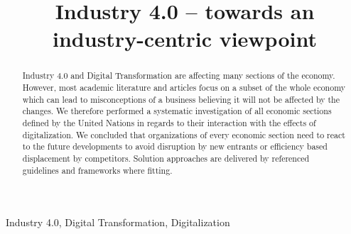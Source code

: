 


\title{Industry 4.0 – towards an industry-centric viewpoint}

\author{
	\and
}

\maketitle
\thispagestyle{plain}
\pagestyle{plain}


\begin{abstract}%
Industry 4.0 and Digital Transformation are affecting many sections of the economy. However, most academic literature and articles focus on a subset of the whole economy which can lead to misconceptions of a business believing it will not be affected by the changes. We therefore performed a systematic investigation of all economic sections defined by the United Nations in regards to their interaction with the effects of digitalization. We concluded that organizations of every economic section need to react to the future developments to avoid disruption by new entrants or efficiency based displacement by competitors. Solution approaches are delivered by referenced guidelines and frameworks where fitting.
\end{abstract}

\begin{IEEEkeywords}
Industry 4.0, Digital Transformation, Digitalization
\end{IEEEkeywords}








\begingroup
\def\UrlBreaks{\do\/\do-}


\endgroup



